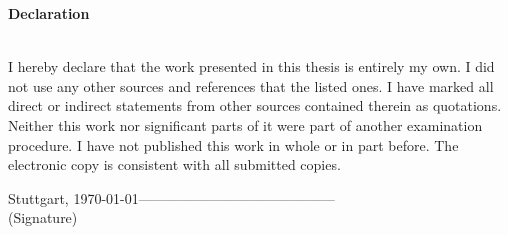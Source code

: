 \documentclass[paper=a4,       %
			 11pt,
			 BCOR0mm,  %
			 DIV10,    %
			 automark, %
			 twoside,
			 halfparskip,
			 bibtotoc,
			 headsepline,
			 normalheadings,
			 appendixprefix,
			 pagesize  %
 ]{scrbook}
\begin{document}
\pagestyle{empty}
\vspace{9cm}
\begin{center}
\begin{minipage}{11cm}
\vspace{6cm}

\textbf{\Large Declaration}\\\\
\vspace{0.4cm}

I hereby declare that the work presented in this thesis is entirely my own. 
I did not use any other sources and references that the listed ones. I have marked all direct or indirect statements from other sources contained therein as quotations. 
Neither this work nor significant parts of it were part of another examination procedure. I have not published this work in whole or in part before. 
The electronic copy is consistent with all submitted copies.
\vspace{1cm}

Stuttgart, \today \hspace{1cm}------------------------------------------\\
\phantom{Stuttgart, \today} \hspace{2.5cm} (Signature)
\end{minipage}
\end{center}
\end{document}
